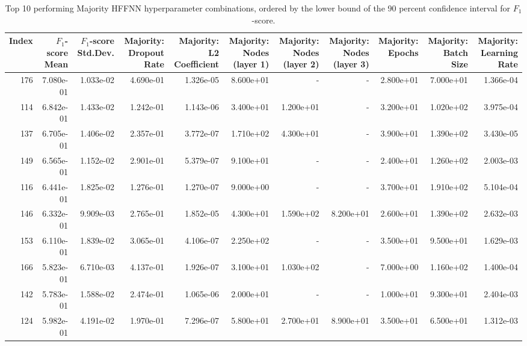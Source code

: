 \begin{table}
\caption{Top 10 performing Majority HFFNN hyperparameter combinations, ordered by the lower bound of the 90 percent confidence interval for $F_1$-score.}
\label{tab:05_best_Majority HFFNN_hpars}
\begin{adjustbox}{width=1\textwidth}
\begin{tabular}{rrrrrrrrrrr}
\toprule
Index & $F_1$-score Mean & $F_1$-score Std.Dev. & Majority: Dropout Rate & Majority: L2 Coefficient & Majority: Nodes (layer 1) & Majority: Nodes (layer 2) & Majority: Nodes (layer 3) & Majority: Epochs & Majority: Batch Size & Majority: Learning Rate \\
\midrule
176 & 7.080e-01 & 1.033e-02 & 4.690e-01 & 1.326e-05 & 8.600e+01 & - & - & 2.800e+01 & 7.000e+01 & 1.366e-04 \\
114 & 6.842e-01 & 1.433e-02 & 1.242e-01 & 1.143e-06 & 3.400e+01 & 1.200e+01 & - & 3.200e+01 & 1.020e+02 & 3.975e-04 \\
137 & 6.705e-01 & 1.406e-02 & 2.357e-01 & 3.772e-07 & 1.710e+02 & 4.300e+01 & - & 3.900e+01 & 1.390e+02 & 3.430e-05 \\
149 & 6.565e-01 & 1.152e-02 & 2.901e-01 & 5.379e-07 & 9.100e+01 & - & - & 2.400e+01 & 1.260e+02 & 2.003e-03 \\
116 & 6.441e-01 & 1.825e-02 & 1.276e-01 & 1.270e-07 & 9.000e+00 & - & - & 3.700e+01 & 1.910e+02 & 5.104e-04 \\
146 & 6.332e-01 & 9.909e-03 & 2.765e-01 & 1.852e-05 & 4.300e+01 & 1.590e+02 & 8.200e+01 & 2.600e+01 & 1.390e+02 & 2.632e-03 \\
153 & 6.110e-01 & 1.839e-02 & 3.065e-01 & 4.106e-07 & 2.250e+02 & - & - & 3.500e+01 & 9.500e+01 & 1.629e-03 \\
166 & 5.823e-01 & 6.710e-03 & 4.137e-01 & 1.926e-07 & 3.100e+01 & 1.030e+02 & - & 7.000e+00 & 1.160e+02 & 1.400e-04 \\
142 & 5.783e-01 & 1.588e-02 & 2.474e-01 & 1.065e-06 & 2.000e+01 & - & - & 1.000e+01 & 9.300e+01 & 2.404e-03 \\
124 & 5.982e-01 & 4.191e-02 & 1.970e-01 & 7.296e-07 & 5.800e+01 & 2.700e+01 & 8.900e+01 & 3.500e+01 & 6.500e+01 & 1.312e-03 \\
\bottomrule
\end{tabular}
\end{adjustbox}
\end{table}
